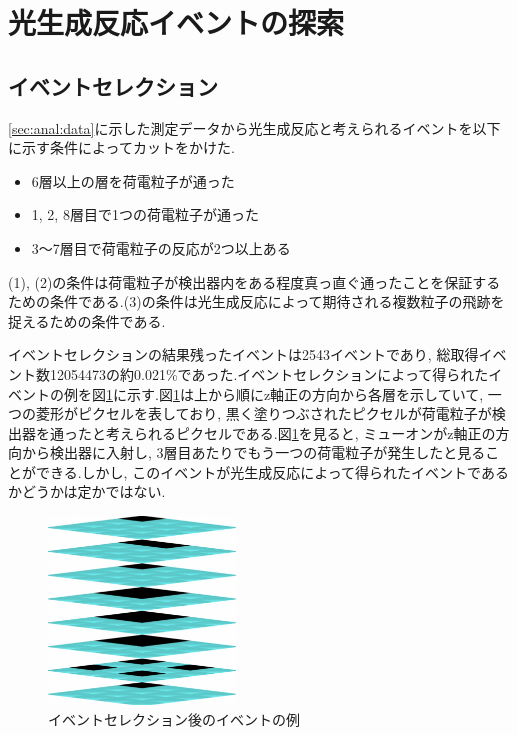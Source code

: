\section{光生成反応イベントの探索}
\subsection{イベントセレクション}\label{sec:anal:eventcut}
\ref{sec:anal:data}に示した測定データから光生成反応と考えられるイベントを以下に示す条件によってカットをかけた.
\begin{itemize}
    \item[(1)] 6層以上の層を荷電粒子が通った
    \item[(2)] 1, 2, 8層目で1つの荷電粒子が通った
    \item[(3)] 3〜7層目で荷電粒子の反応が2つ以上ある
\end{itemize}
(1), (2)の条件は荷電粒子が検出器内をある程度真っ直ぐ通ったことを保証するための条件である.(3)の条件は光生成反応によって期待される複数粒子の飛跡を捉えるための条件である.

イベントセレクションの結果残ったイベントは2543イベントであり, 総取得イベント数12054473の約0.021\%であった.イベントセレクションによって得られたイベントの例を図\ref{fig:eventcuted_event}に示す.図\ref{fig:eventcuted_event}は上から順にz軸正の方向から各層を示していて, 一つの菱形がピクセルを表しており, 黒く塗りつぶされたピクセルが荷電粒子が検出器を通ったと考えられるピクセルである.図\ref{fig:eventcuted_event}を見ると, ミューオンがz軸正の方向から検出器に入射し, 3層目あたりでもう一つの荷電粒子が発生したと見ることができる.しかし, このイベントが光生成反応によって得られたイベントであるかどうかは定かではない.
\begin{figure}[H]
    \centering
    \includegraphics[height=5.0cm]{img/eventcutted_figure.png}
    \caption{イベントセレクション後のイベントの例}
    \label{fig:eventcuted_event}
\end{figure}

